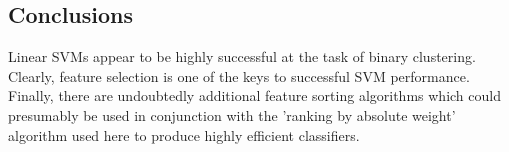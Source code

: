 \documentclass[12pt]{article}
\begin{document}
\subsection{Conclusions}
Linear SVMs appear to be highly successful at the task of binary clustering. Clearly, feature selection is one of the keys to successful SVM performance. Finally, there are undoubtedly additional feature sorting algorithms which could presumably be used in conjunction with the 'ranking by absolute weight' algorithm used here to produce highly efficient classifiers.

    

%
%
\end{document}
